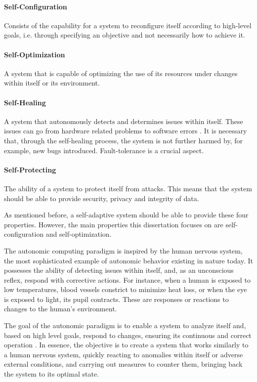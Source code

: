 \paragraph{Self-Configuration} \label{par:self_configuration}  Consists of the capability for a system to reconfigure itself according to high-level goals, i.e. through specifying an objective and not necessarily how to achieve it.

\paragraph{Self-Optimization} \label{par:self_optimization}  A system that is capable of optimizing the use of its resources under changes within itself or its environment.

\paragraph{Self-Healing} \label{par:self_healing}  A system that autonomously detects and determines issues within itself. These issues can go from hardware related problems to software errors \cite{Paulson2002}. It is necessary that, through the self-healing process, the system is not further harmed by, for example, new bugs introduced. Fault-tolerance is a crucial aspect.

\paragraph{Self-Protecting} \label{par:self_protecting} The ability of a system to protect itself from attacks. This means that the system should be able to provide security, privacy and integrity of data.

As mentioned before, a self-adaptive system should be able to provide these four properties. However, the main properties this dissertation focuses on are self-configuration and self-optimization. 

The autonomic computing paradigm is inspired by the human nervous system, the most sophisticated example of autonomic behavior existing in nature today. It possesses the ability of detecting issues within itself, and, as an unconscious reflex, respond with corrective actions. For instance, when a human is exposed to low temperatures, blood vessels constrict to minimize heat loss, or when the eye is exposed to light, its pupil contracts. These are responses or reactions to changes to the human's environment.

The goal of the autonomic paradigm is to enable a system to analyze itself and, based on high level goals, respond to changes, ensuring its continuous and correct operation \cite{Parashar2005}. In essence, the objective is to create a system that works similarly to a human nervous system, quickly reacting to anomalies within itself or adverse external conditions, and carrying out measures to counter them, bringing back the system to its optimal state.

